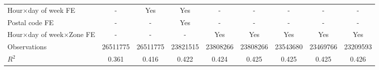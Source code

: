 {\begin{tabular}{l*{8}{S}}
\addlinespace
Hour\(\times\)day of week FE&         {-}         &       {Yes}         &       {Yes}         &         {-}         &         {-}         &         {-}         &         {-}         &         {-}         \\
\addlinespace
Postal code FE      &         {-}         &         {-}         &       {Yes}         &         {-}         &         {-}         &         {-}         &         {-}         &         {-}         \\
\addlinespace
Hour\(\times\)day of week\(\times\)Zone FE&         {-}         &         {-}         &         {-}         &       {Yes}         &       {Yes}         &       {Yes}         &       {Yes}         &       {Yes}         \\
\midrule
Observations        &\num{26511775}         &\num{26511775}         &\num{23821515}         &\num{23808266}         &\num{23808266}         &\num{23543680}         &\num{23469766}         &\num{23209593}         \\
$R^2$             &     {0.361}         &     {0.416}         &     {0.422}         &     {0.424}         &     {0.425}         &     {0.425}         &     {0.425}         &     {0.426}         \\
\bottomrule
\end{tabular}
}
